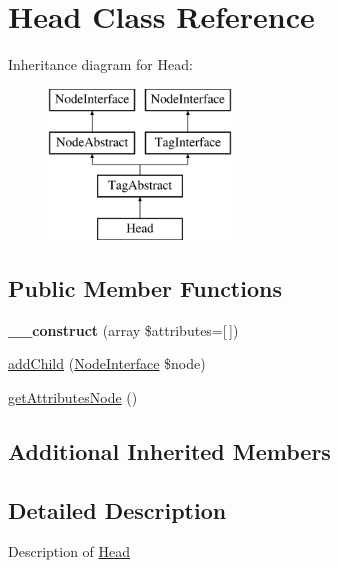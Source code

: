 \hypertarget{class_pes_1_1_dom_1_1_node_1_1_tag_1_1_head}{}\section{Head Class Reference}
\label{class_pes_1_1_dom_1_1_node_1_1_tag_1_1_head}
Inheritance diagram for Head\+:\begin{figure}[H]
\begin{center}
\leavevmode
\includegraphics[height=4.000000cm]{class_pes_1_1_dom_1_1_node_1_1_tag_1_1_head}
\end{center}
\end{figure}
\subsection*{Public Member Functions}
\begin{DoxyCompactItemize}
\item 
\mbox{\label{class_pes_1_1_dom_1_1_node_1_1_tag_1_1_head_afe55bc1439758d475e70446a774807d9}} 
{\bfseries \+\_\+\+\_\+construct} (array \$attributes=\mbox{[}$\,$\mbox{]})
\item 
\mbox{\hyperlink{class_pes_1_1_dom_1_1_node_1_1_tag_1_1_head_a1d59c3782ba90a94f31ee6c58d86e9fc}{add\+Child}} (\mbox{\hyperlink{interface_pes_1_1_dom_1_1_node_1_1_node_interface}{Node\+Interface}} \$node)
\item 
\mbox{\hyperlink{class_pes_1_1_dom_1_1_node_1_1_tag_1_1_head_a4722e7722b245351681b05d35f6694f3}{get\+Attributes\+Node}} ()
\end{DoxyCompactItemize}
\subsection*{Additional Inherited Members}


\subsection{Detailed Description}
Description of \mbox{\hyperlink{class_pes_1_1_dom_1_1_node_1_1_tag_1_1_head}{Head}}

